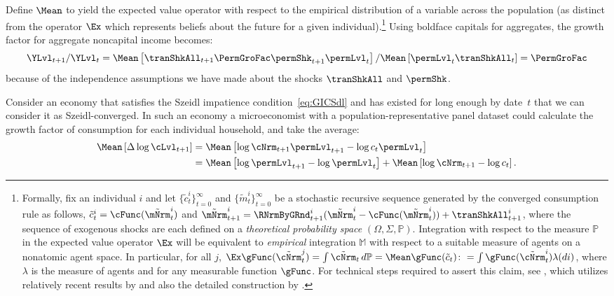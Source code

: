 \documentclass[\econtexRoot/BufferStockTheory]{subfiles}
\begin{document}
Define $\Mean$ to yield the expected value operator with respect to the empirical distribution of a variable across the population (as distinct from the operator $\Ex$ which represents beliefs about the future for a given individual).\footnote{Formally, fix an individual $i$ and let $\{\tilde{c}^{i}_{t}\}_{t=0}^{\infty}$ and $\{\tilde{m}^{i}_{t}\}_{t=0}^{\infty}$ be a stochastic recursive sequence generated by the converged consumption rule as follows, $\tilde{c}^{i}_{t} = \cFunc(\tilde{\mNrm}^{i}_{t})$ and $\tilde{\mNrm}^{i}_{t+1} = \RNrmByGRnd^{i}_{t+1}(\tilde{\mNrm}^{i}_{t} -\cFunc(\tilde{\mNrm}^{i}_{t})) + \tranShkAll^{i}_{t+1}$, where the sequence of exogenous shocks are each defined on a \textit{theoretical probability space} $(\Omega, \Sigma, \mathbb{P})$.
Integration with respect to the measure $\mathbb{P}$ in the expected value operator $\Ex$ will be equivalent to \textit{empirical} integration $\mathbb{M}$ with respect to a suitable measure of agents on a nonatomic agent space.
In particular, for all $j$, $\Ex\gFunc(\tilde{\cNrm}_{t}^{j})  = \int \tilde{\cNrm}_{t}\,d\mathbb{P} =  \Mean\gFunc(\tilde{c}_{t})\colon = \int \gFunc(\tilde{\cNrm}_{t}^{i}) \lambda(di)$, where $\lambda$ is the measure of agents and  for any measurable function $\gFunc$.
For technical steps required to assert this claim, see \cite{Shanker2017a}, which utilizes  relatively recent results by \cite{Sun2009} and also the detailed construction by \cite{Cao2020}.} Using boldface capitals for aggregates, the growth factor for aggregate noncapital income becomes:
\begin{equation*}
  \YLvl_{t+1}/\YLvl_{t}  = \Mean\left[\tranShkAll_{t+1}\PermGroFac \permShk_{t+1}\permLvl_{t}\right]/\Mean\left[\permLvl_{t}\tranShkAll_{t}\right] = \PermGroFac
\end{equation*}
because of the independence assumptions we have made about the shocks $\tranShkAll$ and $\permShk$.

Consider an economy that satisfies the Szeidl impatience condition~\eqref{eq:GICSdl} and has existed for long enough by date~$t$ that we can consider it as Szeidl-converged.
In such an economy a microeconomist with a population-representative panel dataset could calculate the growth factor of consumption for each individual household, and take the average:
\begin{equation}\label{eq:MeanDeltaLogC}
  \begin{aligned}
    \Mean\left[\Delta \log \cLvl_{t+1}\right]  & = \Mean\left[ \log {\cNrm}_{t+1}\permLvl_{t+1} - \log c_{t}\permLvl_{t}\right]  \\
    & = \Mean\left[ \log \permLvl_{t+1}- \log \permLvl_{t}\right] + \Mean\left[ \log {\cNrm}_{t+1} - \log c_{t}\right].
  \end{aligned}
\end{equation}
\end{document}

